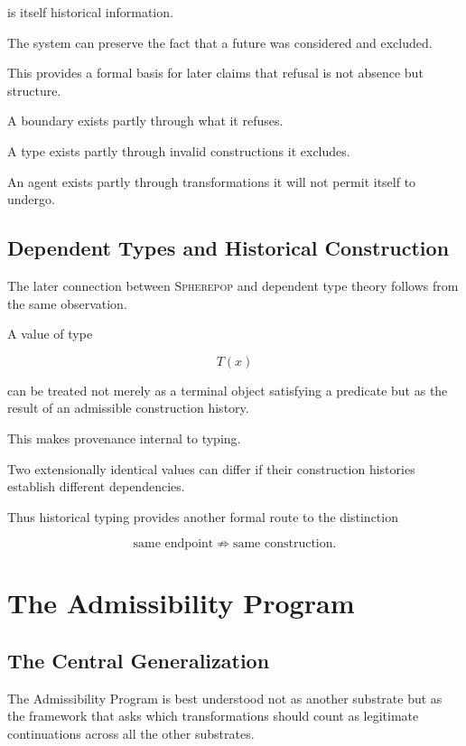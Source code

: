 \documentclass[11pt]{article}
\theoremstyle{remark}
\newcommand{\Spherepop}{\textsc{Spherepop}}
\begin{document}
is itself historical information.

The system can preserve the fact that a future was considered and excluded.

This provides a formal basis for later claims that refusal is not absence but structure.

A boundary exists partly through what it refuses.

A type exists partly through invalid constructions it excludes.

An agent exists partly through transformations it will not permit itself to undergo.

\subsection{Dependent Types and Historical Construction}

The later connection between \Spherepop{} and dependent type theory follows from the same observation.

A value of type

\begin{equation}
T(x)
\end{equation}

can be treated not merely as a terminal object satisfying a predicate but as the result of an admissible construction history.

This makes provenance internal to typing.

Two extensionally identical values can differ if their construction histories establish different dependencies.

Thus historical typing provides another formal route to the distinction

\begin{equation}
\text{same endpoint}
\not\Rightarrow
\text{same construction}.
\end{equation}

\section{The Admissibility Program}

\subsection{The Central Generalization}

The Admissibility Program is best understood not as another substrate but as the framework that asks which transformations should count as legitimate continuations across all the other substrates.
\end{document}
